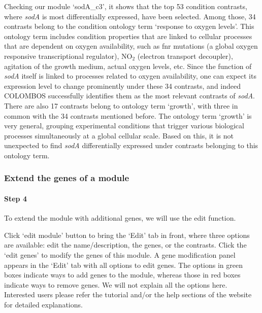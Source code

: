 Checking our module `sodA\_c3', it shows that the top 53 condition contrasts, 
where \textit{sodA} is most differentially expressed, have been selected. Among 
those, 34 contrasts belong to the condition ontology term `response to oxygen 
levels'.  This ontology term includes condition properties that are linked to 
cellular processes that are dependent on oxygen availability, such as fnr 
mutations (a global oxygen responsive transcriptional regulator), NO$_2$ 
(electron transport decoupler), agitation of the growth medium, actual oxygen 
levels, etc. Since the function of \textit{sodA} itself is linked to processes 
related to oxygen availability, one can expect its expression level to change 
prominently under these 34 contrasts, and indeed COLOMBOS successfully 
identifies them as the most relevant contrasts of \textit{sodA}. There are also 
17 contrasts belong to ontology term `growth', with three in common with the 34 
contrasts mentioned before. The ontology term `growth' is very general, 
grouping experimental conditions that trigger various biological processes 
simultaneously at a global cellular scale. Based on this, it is not unexpected 
to find \textit{sodA} differentially expressed under contrasts belonging to 
this ontology term.


\subsubsection{Extend the genes of a module}

\paragraph{Step 4} To extend the module with additional genes, we will use the 
edit function. 

\begin{adjustwidth}{5mm}{0cm}
Click `edit module' button to bring the `Edit' tab in front, 
where three options are available: edit the name/description, the genes, or the 
contrasts. Click the `edit genes' to modify the genes of this module. A gene 
modification panel appears in the `Edit' tab with all options to edit genes. 
The options in green boxes indicate ways to add genes to the module, whereas 
those in red boxes indicate ways to remove genes. We will not explain all the 
options here. Interested users please refer the tutorial and/or the help 
sections of the website for detailed explanations.
\end{adjustwidth}

